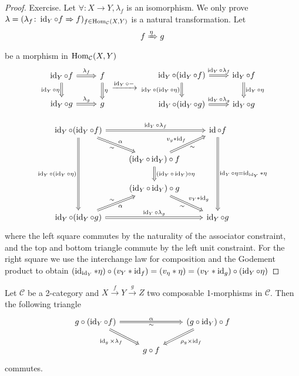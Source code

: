 \begin{proof}
	Exercise.
	Let $ \forall \colon X \to Y, \lambda_f $ is an isomorphism.
	We only prove $ \lambda = ( \lambda_f \colon \operatorname{id}_Y \circ f \Rightarrow f )_{ f \in \operatorname{Hom}_{ \mathcal{C } } ( X , Y ) }$ is a natural transformation.
	Let 
	\[
		f \xRightarrow{\eta} g
	\]
	be a morphism in $ \operatorname{Hom}_{ \mathcal{ C } } ( X, Y )$ 
	\[
	\begin{tikzcd}
		\id_Y \circ f 
		\ar[d, Rightarrow, "\id_Y \circ \eta"']
		\ar[r, Rightarrow, "\lambda_f"]
		&
		f
		\ar[d, Rightarrow, "\eta"]
		\\
		\id_Y \circ g 
		\ar[r, Rightarrow, "\lambda_g"]
		& 
		g
	\end{tikzcd}
	\xrightarrow{ \id_Y \circ - }
	\begin{tikzcd}
		\id_Y \circ ( \id_Y \circ f ) 
		\ar[r,Rightarrow, "\id_Y \circ \lambda_f"]
		\ar[d, Rightarrow, "\id_Y \circ ( \id_Y \circ \eta )"']
		&
		\id_Y \circ f
		\ar[d, Rightarrow, " \id_Y \circ \eta"]
		\\
		\id_Y \circ ( \id_Y \circ g )
		\ar[r, Rightarrow, " \id_Y \circ \lambda_g "]
		&
		\id_Y \circ g
	\end{tikzcd}
	\]
	
	\[
	\begin{tikzcd}
		\id_Y \circ ( \id_Y \circ f )
		\ar[ddd,Rightarrow, " \id_Y \circ ( \id_Y \circ \eta )"']
		\ar[rr, Rightarrow, " \id_Y \circ\lambda_f" ]
		\ar[rd, Rightarrow, "\sim"', "\alpha"]
		&&
		\id \circ f 
		\ar[ddd,Rightarrow, " \id_Y \circ \eta = \id_{ \id_Y } * \eta "]
		\\
		&
		(\id_Y \circ \id_Y ) \circ f 
		\ar[ru,Rightarrow, " v_y * \id_f","\sim"']
		\ar[d, Rightarrow, " ( \id_Y \circ \id_Y) \circ \eta" ]
		\\
		&
		(\id_Y \circ \id_Y ) \circ g
		\ar[rd, Rightarrow, "v_Y * \id_g", "\sim"']
		\\
		\id_Y \circ ( \id_Y \circ g ) 
		\ar[ru, Rightarrow, "\sim", " \alpha"']
		\ar[rr, Rightarrow, " \id_Y \circ \lambda_g"]	
		&&
		\id_Y \circ g
	\end{tikzcd}
	\]
	where the left square commutes by the naturality of the associator constraint, and the top and bottom triangle commute by the left unit constraint.
	For the right square we use the interchange law for composition and the Godement product to obtain $ ( \operatorname{id}_{ \operatorname{id}_Y } * \eta ) \circ ( v_Y * \operatorname{id}_f ) = ( v_\eta * \eta ) = ( v_Y * \operatorname{id}_g ) \circ ( \operatorname{id}_Y \circ \eta )$
\end{proof}

\begin{prop}
	Let $ \mathcal{ C } $ be a 2-category and $ X \xrightarrow{ f } Y \xrightarrow{ g } Z $ two composable 1-morphisms in $\mathcal{ C }$.
	Then the following triangle 
	\[
	\begin{tikzcd}
		g \circ ( \id_Y \circ f)
		\ar[rr, Rightarrow, "\alpha", "\sim"']
		\ar[rd, Rightarrow,"\id_g \times \lambda_f"']
		&&
		( g \circ \id_Y ) \circ f 
		\ar[dl, Rightarrow, " \rho_g \times \id_f"]
		\\
		&
		g \circ f 
	\end{tikzcd}
	\]
	commutes.
\end{prop}

